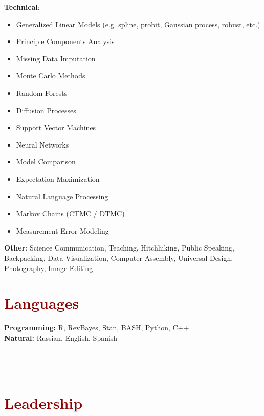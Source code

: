 \documentclass[11pt,margin,line]{resume}
\begin{document}
\begin{resume}
\textbf{Technical}:\vspace{-4.5mm}
\begin{multicols}{2}
    \begin{itemize}
    \setlength\itemsep{-0.2em}
         \item Generalized Linear Models (e.g. spline, probit, Gaussian process, robust, etc.)
         \item Principle Components Analysis
         \item Missing Data Imputation
	\item Monte Carlo Methods
         \item Random Forests
	\item Diffusion Processes
         \item Support Vector Machines
         \item Neural Networks
	\item Model Comparison
	\item Expectation-Maximization
	\item Natural Language Processing
	\item Markov Chains (CTMC / DTMC)
	\item Measurement Error Modeling
    \end{itemize}
    \end{multicols}\vspace{-4.5mm}
\textbf{Other}: Science Communication, Teaching, Hitchhiking, Public Speaking, Backpacking, Data Visualization, Computer Assembly, Universal Design, Photography, Image Editing 

\section{\large\textcolor{DarkRed}{Languages}}

\textbf{Programming:} R, RevBayes, Stan, BASH, Python, C++\\
\textbf{Natural:} Russian, English, Spanish\\\\\\\\


\section{\large\textcolor{DarkRed}{Leadership}}


\end{resume}
\end{document}

